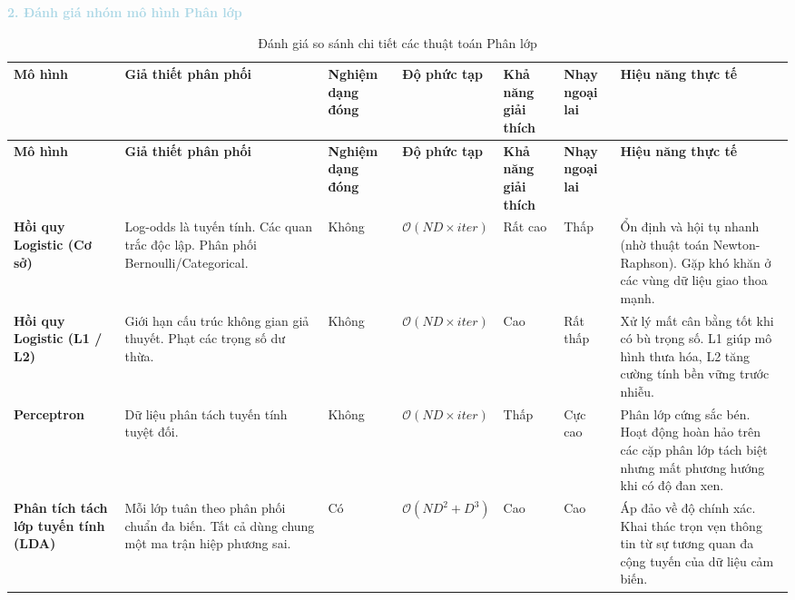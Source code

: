 \vspace{0.5em}
\noindent\textcolor{lightblue}{\textbf{2. Đánh giá nhóm mô hình Phân lớp}}
\vspace{0.5em}

\setlength\LTleft{-0.6cm}
\setlength\LTright{0pt}
\begin{longtable}{|>{\raggedright\arraybackslash}p{2.25cm}|>{\raggedright\arraybackslash}p{2.8cm}|>{\centering\arraybackslash}p{1.4cm}|>{\centering\arraybackslash}p{1.95cm}|>{\centering\arraybackslash}p{1.3cm}|>{\centering\arraybackslash}p{1.3cm}|>{\raggedright\arraybackslash}p{2.7cm}|}
    \caption{Đánh giá so sánh chi tiết các thuật toán Phân lớp} \\
    \hline
    \centering\textbf{Mô hình} & \centering\textbf{Giả thiết phân phối} & \textbf{Nghiệm dạng đóng} & \textbf{Độ phức tạp} & \textbf{Khả năng giải thích} & \textbf{Nhạy ngoại lai} & \centering\arraybackslash\textbf{Hiệu năng thực tế} \\
    \hline
    \endfirsthead
    \hline
    \centering\textbf{Mô hình} & \centering\textbf{Giả thiết phân phối} & \textbf{Nghiệm dạng đóng} & \textbf{Độ phức tạp} & \textbf{Khả năng giải thích} & \textbf{Nhạy ngoại lai} & \centering\arraybackslash\textbf{Hiệu năng thực tế} \\
    \hline
    \endhead
    \hline
    \endfoot
    \hline
    \endlastfoot
    \textbf{Hồi quy Logistic (Cơ sở)} & Log-odds là tuyến tính. Các quan trắc độc lập. Phân phối Bernoulli/Categorical. & Không & $\mathcal{O}(ND \times iter)$ & Rất cao & Thấp & Ổn định và hội tụ nhanh (nhờ thuật toán Newton-Raphson). Gặp khó khăn ở các vùng dữ liệu giao thoa mạnh. \\
    \hline
    \textbf{Hồi quy Logistic (L1 / L2)} & Giới hạn cấu trúc không gian giả thuyết. Phạt các trọng số dư thừa. & Không & $\mathcal{O}(ND \times iter)$ & Cao & Rất thấp & Xử lý mất cân bằng tốt khi có bù trọng số. L1 giúp mô hình thưa hóa, L2 tăng cường tính bền vững trước nhiễu. \\
    \hline
    \textbf{Perceptron} & Dữ liệu phân tách tuyến tính tuyệt đối. & Không & $\mathcal{O}(ND \times iter)$ & Thấp & Cực cao & Phân lớp cứng sắc bén. Hoạt động hoàn hảo trên các cặp phân lớp tách biệt nhưng mất phương hướng khi có độ đan xen. \\
    \hline
    \textbf{Phân tích tách lớp tuyến tính (LDA)} & Mỗi lớp tuân theo phân phối chuẩn đa biến. Tất cả dùng chung một ma trận hiệp phương sai. & Có & $\mathcal{O}(ND^2 + D^3)$ & Cao & Cao & Áp đảo về độ chính xác. Khai thác trọn vẹn thông tin từ sự tương quan đa cộng tuyến của dữ liệu cảm biến. \\

\end{longtable}

